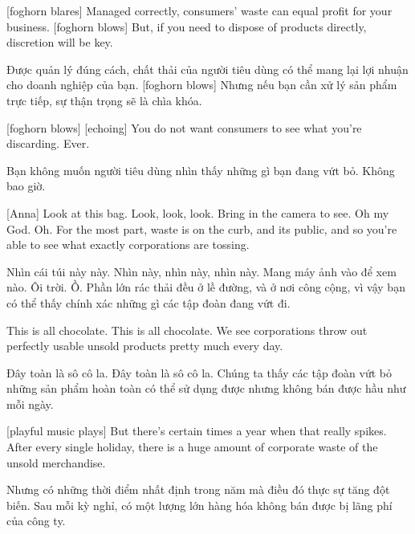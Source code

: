 \documentclass[a4paper]{article}
\begin{document}
	[foghorn blares]
	Managed correctly, consumers' waste can equal profit for your business.
	[foghorn blows]
	But, if you need to dispose of products directly, discretion will be key.
	
	\begin{vietnamese-v2}
		Được quản lý đúng cách, chất thải của người tiêu dùng có thể mang lại lợi nhuận cho doanh nghiệp của bạn.
		[foghorn blows]
		Nhưng nếu bạn cần xử lý sản phẩm trực tiếp, sự thận trọng sẽ là chìa khóa.
	\end{vietnamese-v2}
	
	
	[foghorn blows]
	[echoing] You do not want consumers to see what you're discarding. Ever.
	
	
	\begin{vietnamese-v2}
		 Bạn không muốn người tiêu dùng nhìn thấy những gì bạn đang vứt bỏ. Không bao giờ.
	\end{vietnamese-v2}
	
	[Anna] Look at this bag.
	Look, look, look.
	Bring in the camera to see.
	Oh my God. Oh.
	For the most part, waste is on the curb, and its public, and so you're able to see what exactly corporations are tossing.
	
	\begin{vietnamese-v2}
		[Anna] Nhìn cái túi này này.
		Nhìn này, nhìn này, nhìn này.
		Mang máy ảnh vào để xem nào.
		Ôi trời. Ồ.
		Phần lớn rác thải đều ở lề đường, và ở nơi công cộng, vì vậy bạn có thể thấy chính xác những gì các tập đoàn đang vứt đi.
	\end{vietnamese-v2}
	
	This is all chocolate.
	This is all chocolate.
	We see corporations throw out perfectly usable unsold products pretty much every day.
	
	\begin{vietnamese-v2}
		Đây toàn là sô cô la.
		Đây toàn là sô cô la.
		Chúng ta thấy các tập đoàn vứt bỏ những sản phẩm hoàn toàn có thể sử dụng được nhưng không bán được hầu như mỗi ngày.
	\end{vietnamese-v2}
	
	[playful music plays]
	But there's certain times a year when that really spikes.
	After every single holiday, there is a huge amount of corporate waste of the unsold merchandise.
	
	\begin{vietnamese-v2}
		Nhưng có những thời điểm nhất định trong năm mà điều đó thực sự tăng đột biến.
		Sau mỗi kỳ nghỉ, có một lượng lớn hàng hóa không bán được bị lãng phí của công ty.
	\end{vietnamese-v2}
	
\end{document}

